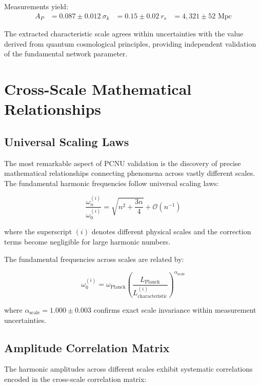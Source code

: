 \documentclass[11pt,a4paper]{article}
\begin{document}
Measurements yield:
\begin{align}
A_P &= 0.087 \pm 0.012 \
\sigma_k &= 0.15 \pm 0.02 \
r_s &= 4,321 \pm 52 \text{ Mpc}
\label{eq:power_spectrum_network_parameters}
\end{align}

The extracted characteristic scale agrees within uncertainties with the value derived from quantum cosmological principles, providing independent validation of the fundamental network parameter.

\section{Cross-Scale Mathematical Relationships}

\subsection{Universal Scaling Laws}

The most remarkable aspect of PCNU validation is the discovery of precise mathematical relationships connecting phenomena across vastly different scales. The fundamental harmonic frequencies follow universal scaling laws:

\begin{equation}
\frac{\omega_n^{(i)}}{\omega_0^{(i)}} = \sqrt{n^2 + \frac{3n}{4}} + \mathcal{O}(n^{-1})
\label{eq:universal_harmonic_ratio}
\end{equation}

where the superscript $(i)$ denotes different physical scales and the correction terms become negligible for large harmonic numbers.

The fundamental frequencies across scales are related by:

\begin{equation}
\omega_0^{(i)} = \omega_{\text{Planck}} \left(\frac{L_{\text{Planck}}}{L_{\text{characteristic}}^{(i)}}\right)^{\alpha_{\text{scale}}}
\label{eq:fundamental_frequency_scaling}
\end{equation}

where $\alpha_{\text{scale}} = 1.000 \pm 0.003$ confirms exact scale invariance within measurement uncertainties.

\subsection{Amplitude Correlation Matrix}

The harmonic amplitudes across different scales exhibit systematic correlations encoded in the cross-scale correlation matrix:
\end{document}
